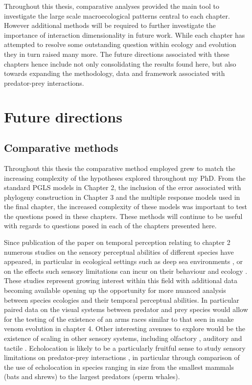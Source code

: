 Throughout this thesis, comparative analyses provided the main tool to investigate the large scale macroecological patterns central to each chapter. However additional methods will be required to further investigate the importance of interaction dimensionality in future work. While each chapter has attempted to resolve some outstanding question within ecology and evolution they in turn raised many more. The future directions associated with these chapters hence include not only consolidating the results found here, but also towards expanding the methodology, data and framework associated with predator-prey interactions.


\section{\uppercase{F}uture directions}

\subsection{Comparative methods}


Throughout this thesis the comparative method employed grew to match the increasing complexity of the hypotheses explored throughout my PhD. From the standard PGLS models in Chapter 2, the inclusion of the error associated with phylogeny construction in Chapter 3 and the multiple response models used in the final chapter, the increased complexity of these models was important to test the questions posed in these chapters. These methods will continue to be useful with regards to questions posed in each of the chapters presented here. 

Since publication of the paper on temporal perception relating to chapter 2 \citep{healy2013metabolic} numerous studies on the sensory perceptual abilities of different species have appeared, in particular in ecological settings such as deep sea environments \citep{kalinoski2014spectral,Wegner15052015,landgren2014visual}, or on the effects such sensory limitations can incur on their behaviour and ecology \citep{bar2015sensory,inger2014potential}. These studies represent growing interest within this field with additional data becoming available opening up the opportunity for more nuanced analysis between species ecologies and their temporal perceptual abilities. In particular paired data on the visual systems between predator and prey species would allow for the testing of the existence of an arms races similar to that seen in snake venom evolution in chapter 4. Other interesting avenues to explore would be the existence of scaling in other sensory systems, including olfactory \citep{uchida2003speed}, auditory \citep{bar2015sensory} and tactile \citep{braam2005touch}. Echolocation is likely to be a particularly fruitful sense to study sensory limitations on predator-prey interactions \citep{bar2015sensory}, in particular through comparison of the use of echolocation in species ranging in size from the smallest mammals (bats and shrews) to the largest predators (sperm whales).


